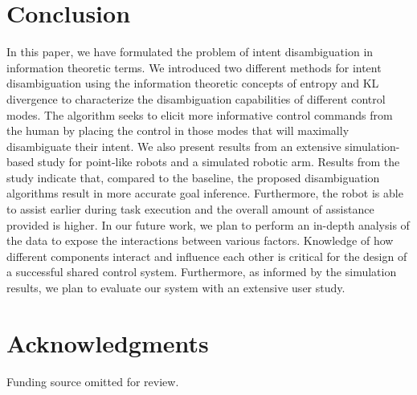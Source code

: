 \documentclass[conference]{IEEEtran}
\begin{document}
\section{Conclusion}\label{sec:conclusions}
In this paper, we have formulated the problem of intent disambiguation in information theoretic terms. We introduced two different methods for intent disambiguation using the information theoretic concepts of entropy and KL divergence to characterize the disambiguation capabilities of different control modes. The algorithm seeks to elicit more informative control commands from the human by placing the control in those modes that will maximally disambiguate their intent. We also present results from an extensive simulation-based study for point-like robots and a simulated robotic arm. Results from the study indicate that, compared to the baseline, the proposed disambiguation algorithms result in more accurate goal inference. Furthermore, the robot is able to assist earlier during task execution and the overall amount of assistance provided is higher. In our future work, we plan to perform an in-depth analysis of the data to expose the interactions between various factors. Knowledge of how different components interact and influence each other is critical for the design of a successful shared control system. Furthermore, as informed by the simulation results, we plan to evaluate our system with an extensive user study. 

\section*{Acknowledgments}
Funding source omitted for review. 
\balance


\end{document}
